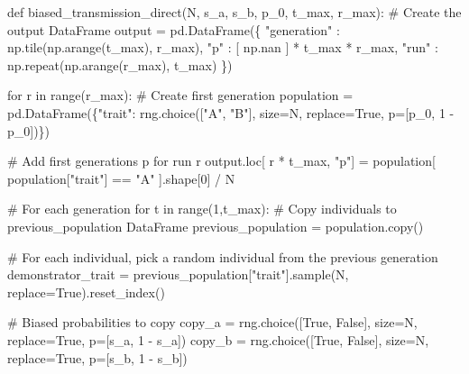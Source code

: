 \documentclass[
  a4paperpaper,
  ,captions=tableheading
]{scrbook}
\newenvironment{Shaded}{\begin{snugshade}}{\end{snugshade}}
\newcommand{\BuiltInTok}[1]{\textcolor[rgb]{0.00,0.23,0.31}{#1}}
\newcommand{\CommentTok}[1]{\textcolor[rgb]{0.37,0.37,0.37}{#1}}
\newcommand{\ControlFlowTok}[1]{\textcolor[rgb]{0.00,0.23,0.31}{#1}}
\newcommand{\DecValTok}[1]{\textcolor[rgb]{0.68,0.00,0.00}{#1}}
\newcommand{\KeywordTok}[1]{\textcolor[rgb]{0.00,0.23,0.31}{#1}}
\newcommand{\NormalTok}[1]{\textcolor[rgb]{0.00,0.23,0.31}{#1}}
\newcommand{\OperatorTok}[1]{\textcolor[rgb]{0.37,0.37,0.37}{#1}}
\newcommand{\StringTok}[1]{\textcolor[rgb]{0.13,0.47,0.30}{#1}}
\newcommand{\VariableTok}[1]{\textcolor[rgb]{0.07,0.07,0.07}{#1}}
\begin{document}
\begin{Shaded}
\begin{Highlighting}[]
\KeywordTok{def}\NormalTok{ biased\_transmission\_direct(N, s\_a, s\_b, p\_0, t\_max, r\_max):}
    \CommentTok{\# Create the output DataFrame}
\NormalTok{    output }\OperatorTok{=}\NormalTok{ pd.DataFrame(\{}
        \StringTok{"generation"}\NormalTok{ : np.tile(np.arange(t\_max), r\_max),}
        \StringTok{"p"}\NormalTok{ : [ np.nan ] }\OperatorTok{*}\NormalTok{ t\_max }\OperatorTok{*}\NormalTok{ r\_max,}
        \StringTok{"run"}\NormalTok{ : np.repeat(np.arange(r\_max), t\_max)}
\NormalTok{    \})}

    \ControlFlowTok{for}\NormalTok{ r }\KeywordTok{in} \BuiltInTok{range}\NormalTok{(r\_max):}
        \CommentTok{\# Create first generation}
\NormalTok{        population }\OperatorTok{=}\NormalTok{ pd.DataFrame(\{}\StringTok{"trait"}\NormalTok{: rng.choice([}\StringTok{"A"}\NormalTok{, }\StringTok{"B"}\NormalTok{], size}\OperatorTok{=}\NormalTok{N, replace}\OperatorTok{=}\VariableTok{True}\NormalTok{, p}\OperatorTok{=}\NormalTok{[p\_0, }\DecValTok{1} \OperatorTok{{-}}\NormalTok{ p\_0])\})}

        \CommentTok{\# Add first generation\textquotesingle{}s p for run r}
\NormalTok{        output.loc[ r }\OperatorTok{*}\NormalTok{ t\_max, }\StringTok{"p"}\NormalTok{] }\OperatorTok{=}\NormalTok{ population[ population[}\StringTok{"trait"}\NormalTok{] }\OperatorTok{==} \StringTok{"A"}\NormalTok{ ].shape[}\DecValTok{0}\NormalTok{] }\OperatorTok{/}\NormalTok{ N}

        \CommentTok{\# For each generation }
        \ControlFlowTok{for}\NormalTok{ t }\KeywordTok{in} \BuiltInTok{range}\NormalTok{(}\DecValTok{1}\NormalTok{,t\_max):}
            \CommentTok{\# Copy individuals to previous\_population DataFrame}
\NormalTok{            previous\_population }\OperatorTok{=}\NormalTok{ population.copy()}

            \CommentTok{\# For each individual, pick a random individual from the previous generation}
\NormalTok{            demonstrator\_trait }\OperatorTok{=}\NormalTok{ previous\_population[}\StringTok{"trait"}\NormalTok{].sample(N, replace}\OperatorTok{=}\VariableTok{True}\NormalTok{).reset\_index()}
            
            \CommentTok{\# Biased probabilities to copy}
\NormalTok{            copy\_a }\OperatorTok{=}\NormalTok{ rng.choice([}\VariableTok{True}\NormalTok{, }\VariableTok{False}\NormalTok{], size}\OperatorTok{=}\NormalTok{N, replace}\OperatorTok{=}\VariableTok{True}\NormalTok{, p}\OperatorTok{=}\NormalTok{[s\_a, }\DecValTok{1} \OperatorTok{{-}}\NormalTok{ s\_a])}
\NormalTok{            copy\_b }\OperatorTok{=}\NormalTok{ rng.choice([}\VariableTok{True}\NormalTok{, }\VariableTok{False}\NormalTok{], size}\OperatorTok{=}\NormalTok{N, replace}\OperatorTok{=}\VariableTok{True}\NormalTok{, p}\OperatorTok{=}\NormalTok{[s\_b, }\DecValTok{1} \OperatorTok{{-}}\NormalTok{ s\_b])}


\end{Highlighting}
\end{Shaded}
\end{document}
